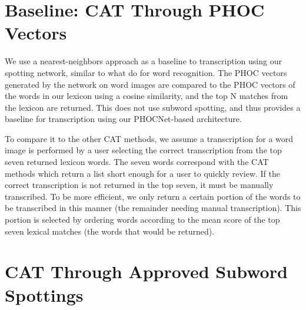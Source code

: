 \documentclass[ms,electronic,twosidetoc,letterpaper,chaptercenter,parttop,lof,lot]{byumsphd}
\begin{document}
\section{Baseline: CAT Through PHOC Vectors}
We use a nearest-neighbors approach as a baseline to transcription using our spotting network, similar to what \cite{krishnan2016} do for word recognition. The PHOC vectors generated by the network on word images are compared to the PHOC vectors of the  words in our lexicon using a cosine similarity, and the top N matches from the lexicon are returned. This does not use subword spotting, and thus provides a baseline for transcription using our PHOCNet-based architecture.

To compare it to the other CAT methods, we assume a transcription for a word image is performed by a user selecting the correct transcription from the top seven returned lexicon words. The seven words correspond with the CAT methods which return a list short enough for a user to quickly review. If the correct transcription is not returned in the top seven, it must be manually transcribed.
To be more efficient, we only return a certain portion of the words to be transcribed in this manner (the remainder needing manual transcription). This portion is selected by ordering words according to the mean score of the top seven lexical matches (the words that would be returned).







\section{CAT Through Approved Subword Spottings}
\end{document}
